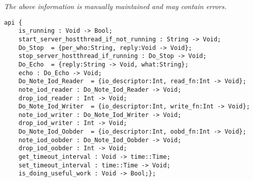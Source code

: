 \label{api:Io\_Wait\_Hostthread}

{\tiny \it The above information is manually maintained and may contain errors.}
\begin{verbatim}
api {
    is_running : Void -> Bool;
    start_server_hostthread_if_not_running : String -> Void;
    Do_Stop  = {per_who:String, reply:Void -> Void};
    stop_server_hostthread_if_running : Do_Stop -> Void;
    Do_Echo  = {reply:String -> Void, what:String};
    echo : Do_Echo -> Void;
    Do_Note_Iod_Reader  = {io_descriptor:Int, read_fn:Int -> Void};
    note_iod_reader : Do_Note_Iod_Reader -> Void;
    drop_iod_reader : Int -> Void;
    Do_Note_Iod_Writer  = {io_descriptor:Int, write_fn:Int -> Void};
    note_iod_writer : Do_Note_Iod_Writer -> Void;
    drop_iod_writer : Int -> Void;
    Do_Note_Iod_Oobder  = {io_descriptor:Int, oobd_fn:Int -> Void};
    note_iod_oobder : Do_Note_Iod_Oobder -> Void;
    drop_iod_oobder : Int -> Void;
    get_timeout_interval : Void -> time::Time;
    set_timeout_interval : time::Time -> Void;
    is_doing_useful_work : Void -> Bool;};
\end{verbatim}
